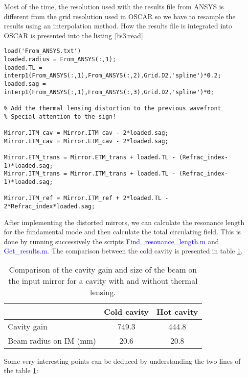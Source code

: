 Most of the time, the resolution used with the results file from ANSYS is different from the grid resolution used in OSCAR so we have to resample the results using an interpolation method. How the results file is integrated into OSCAR is presented into the listing \ref{lis3:read}

\begin{lstlisting}[float=tp,caption=Commands used to read thermal lensing results from ANSYS. \label{lis3:read},frame=lines]
% Load the results file
load('From_ANSYS.txt')
loaded.radius = From_ANSYS(:,1);
loaded.TL = interp1(From_ANSYS(:,1),From_ANSYS(:,2),Grid.D2,'spline')*0.2;
loaded.sag = interp1(From_ANSYS(:,1),From_ANSYS(:,3),Grid.D2,'spline')*0;

% Add the thermal lensing distortion to the previous wavefront
% Special attention to the sign!

Mirror.ITM_cav = Mirror.ITM_cav - 2*loaded.sag;
Mirror.ETM_cav = Mirror.ETM_cav - 2*loaded.sag;

Mirror.ETM_trans = Mirror.ETM_trans + loaded.TL - (Refrac_index-1)*loaded.sag;
Mirror.ITM_trans = Mirror.ITM_trans + loaded.TL - (Refrac_index-1)*loaded.sag;

Mirror.ITM_ref = Mirror.ITM_ref + 2*loaded.TL - 2*Refrac_index*loaded.sag;
\end{lstlisting}

After implementing the distorted mirrors, we can calculate the resonance length for the fundamental mode and then calculate the total circulating field. This is done by running successively the scripts \textcolor{blue}{Find\_resonance\_length.m} and \textcolor{blue}{Get\_results.m}. The comparison between the cold cavity is presented in table \ref{tab3:res}.

\begin{table}[tbp]
  \centering
  \caption{\label{tab3:res} Comparison of the cavity gain and size of the beam on the input mirror for a cavity with and without thermal lensing.}
\begin{tabular}{|l |c|c|}
\hline
{\large\strut} & Cold cavity & Hot cavity \\
\hline
{\large\strut} Cavity gain & 749.3 & 444.8 \\
{\large\strut} Beam radius on IM (mm)& 20.6 & 20.8 \\
\hline
\end{tabular}
\end{table}

Some very interesting points can be deduced by understanding the two lines of the table \ref{tab3:res}:

